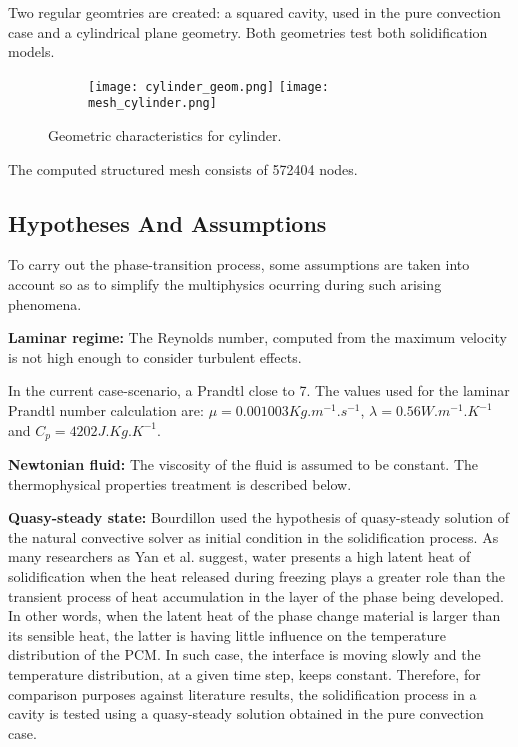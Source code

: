 \setlength{\parindent}{0.5cm} Two regular geomtries are created: a squared cavity, used in the pure convection case and a cylindrical plane geometry. Both geometries test both solidification models.

\begin{figure}[h!]
	\centering
	\begin{subfigure}{\linewidth}
		\texttt{[image: cylinder\_geom.png]}\hfill
		\texttt{[image: mesh\_cylinder.png]}	
		\label{BBPF_NCMF}
	\end{subfigure}
	\label{3.7fig}
	\caption{Geometric characteristics for cylinder.}
\end{figure} 
The computed structured mesh consists of 572404 nodes.

\subsection{Hypotheses And Assumptions}

\setlength{\parindent}{0.5cm} To carry out the phase-transition process, some assumptions are taken into account so as to simplify the multiphysics ocurring during such arising phenomena. 

\textbf{Laminar regime:} The Reynolds number, computed from the maximum velocity is not high enough to consider turbulent effects. 

\noindent In the current case-scenario, a Prandtl close to 7. The values used for the laminar Prandtl number calculation are: $\mu = 0.001003 Kg.m^{-1}.s^{-1}$, $\lambda = 0.56 W.m^{-1}.K^{-1}$ and $C_{p}=4202 J.Kg.K^{-1}$.

\textbf{Newtonian fluid:} The viscosity of the fluid is assumed to be constant.
The thermophysical properties treatment is described below.

\textbf{Quasy-steady state:} Bourdillon \cite{bourdillon_2016} used the hypothesis of quasy-steady solution of the natural convective solver as initial condition in the solidification process. As many researchers as Yan et al. \cite{yan_xu_qiu_gang_2017} suggest, water presents a high latent heat of solidification when the heat released during freezing plays a greater role than the transient process of heat accumulation in the layer of the phase being developed. In other words, when the latent heat of the phase change material is larger than its sensible heat, the latter is having little influence on the temperature distribution of the PCM. In such case, the interface is moving slowly and the temperature distribution, at a given time step, keeps constant. Therefore, for comparison purposes against literature results, the solidification process in a cavity is tested using a quasy-steady solution obtained in the pure convection case.

